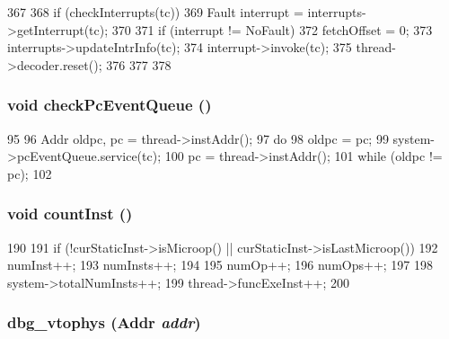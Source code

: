 \begin{DoxyCode}
367 {
368     if (checkInterrupts(tc)) {
369         Fault interrupt = interrupts->getInterrupt(tc);
370 
371         if (interrupt != NoFault) {
372             fetchOffset = 0;
373             interrupts->updateIntrInfo(tc);
374             interrupt->invoke(tc);
375             thread->decoder.reset();
376         }
377     }
378 }
\end{DoxyCode}
\hypertarget{classBaseSimpleCPU_a925a66fd31bbc43fa4bc4a90d5b316cb}{
\subsubsection[{checkPcEventQueue}]{\setlength{\rightskip}{0pt plus 5cm}void checkPcEventQueue ()}}
\label{classBaseSimpleCPU_a925a66fd31bbc43fa4bc4a90d5b316cb}



\begin{DoxyCode}
95                                     {
96         Addr oldpc, pc = thread->instAddr();
97         do {
98             oldpc = pc;
99             system->pcEventQueue.service(tc);
100             pc = thread->instAddr();
101         } while (oldpc != pc);
102     }
\end{DoxyCode}
\hypertarget{classBaseSimpleCPU_ae14e8c918d9e0fa1f09581af157369e2}{
\subsubsection[{countInst}]{\setlength{\rightskip}{0pt plus 5cm}void countInst ()}}
\label{classBaseSimpleCPU_ae14e8c918d9e0fa1f09581af157369e2}



\begin{DoxyCode}
190     {
191         if (!curStaticInst->isMicroop() || curStaticInst->isLastMicroop()) {
192             numInst++;
193             numInsts++;
194         }
195         numOp++;
196         numOps++;
197 
198         system->totalNumInsts++;
199         thread->funcExeInst++;
200     }
\end{DoxyCode}
\hypertarget{classBaseSimpleCPU_a7e2d118d430dcbebd896ba39811ef03b}{
\subsubsection[{dbg\_\-vtophys}]{ dbg\_\-vtophys ({\bf Addr} {\em addr})}}
\label{classBaseSimpleCPU_a7e2d118d430dcbebd896ba39811ef03b}



